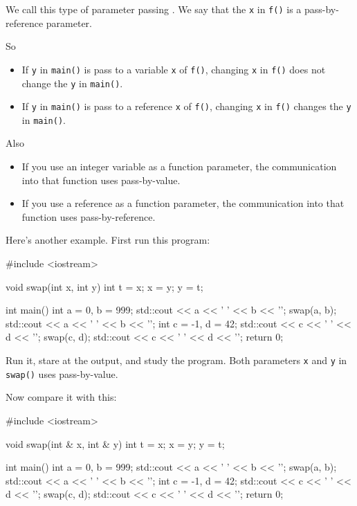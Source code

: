 We call this type of parameter passing . We say that the \texttt{x} in \texttt{f()} is a pass-by-reference parameter.

So

\begin{itemize}
\item If \texttt{y} in \texttt{main()} is pass to a variable \texttt{x} of \texttt{f()}, changing \texttt{x} in \texttt{f()} does not change the \texttt{y} in \texttt{main()}.
\item If \texttt{y} in \texttt{main()} is pass to a reference \texttt{x} of \texttt{f()}, changing \texttt{x} in \texttt{f()} changes the \texttt{y} in \texttt{main()}.
\end{itemize}

Also

\begin{itemize}
\item If you use an integer variable as a function parameter, the communication into that function uses pass-by-value.
\item If you use a reference as a function parameter, the communication into that function uses pass-by-reference.
\end{itemize}

Here's another example. First run this program:

\begin{consolethree}[escapeinside=||]
#include <iostream>

void swap(int x, int y)
{
    int t = x;
    x = y;
    y = t;
}

int main()
{
    int a = 0, b = 999;
    std::cout << a << ' ' << b << '\n';
    swap(a, b);
    std::cout << a << ' ' << b << '\n';
    int c = -1, d = 42;
    std::cout << c << ' ' << d << '\n';
    swap(c, d);
    std::cout << c << ' ' << d << '\n';
    return 0;
}
\end{consolethree}

Run it, stare at the output, and study the program. Both parameters \texttt{x} and \texttt{y} in \texttt{swap()} uses pass-by-value.

Now compare it with this:

\begin{consolethree}[escapeinside=||]
#include <iostream>

void swap(int & x, int & y)
{
    int t = x;
    x = y;
    y = t;
}

int main()
{
    int a = 0, b = 999;
    std::cout << a << ' ' << b << '\n';
    swap(a, b);
    std::cout << a << ' ' << b << '\n';
    int c = -1, d = 42;
    std::cout << c << ' ' << d << '\n';
    swap(c, d);
    std::cout << c << ' ' << d << '\n';
    return 0;
}
\end{consolethree}

